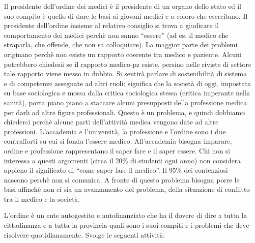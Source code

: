 \documentclass[]{article}
\begin{document}
Il presidente dell'ordine dei medici è il presidente di un organo dello
stato ed il suo compito è quello di dare le basi ai giovani medici e a
coloro che esercitano. Il presidente dell'ordine insieme al relativo
consiglio si trova a giudicare il comportamento dei medici perchè non
sanno ``essere'' (ad es. il medico che straparla, che offende, che non
sa colloquiare). La maggior parte dei problemi originano perchè non
esiste un rapporto coerente tra medico e paziente. Alcuni potrebbero
chiedesii se il rapporto medico-pz esiste, persino nelle riviste di
settore tale rapporto viene messo in dubbio. Si sentirà parlare di
sostenibilità di sistema e di competenze assegnate ad altri ruoli:
significa che la società di oggi, impostata su base sociologica e mossa
dalla critica sociologica stessa (critica imperante nella sanità), porta
piano piano a staccare alcuni presupposti della professione medica per
darli ad altre figure professionali. Questo è un problema, e quindi
dobbiamo chiederci perchè alcune parti dell'attività medica vengono date
ad altre professioni. L'accademia e l'università, la professione e
l'ordine sono i due contrafforti su cui si fonda l'essere medico.
All'accademia bisogna imparare, ordine e professione rappresentano il
saper fare e il saper essere. Chi non si interessa a questi argomenti
(circa il 20\% di studenti ogni anno) non considera appieno il
significato di ``come saper fare il medico''. Il 95\% dei contenziosi
nascono perchè non si comunica. A fronte di questo problema bisogna
porre le basi affinchè non ci sia un avanzamento del problema, della
situazione di conflitto tra il medico e la società.

L'ordine è un ente autogestito e autofinanziato che ha il dovere di dire
a tutta la cittadinanza e a tutta la provincia quali sono i suoi compiti
e i problemi che deve risolvere quotidianamente. Svolge le seguenti
attività:
\end{document}

